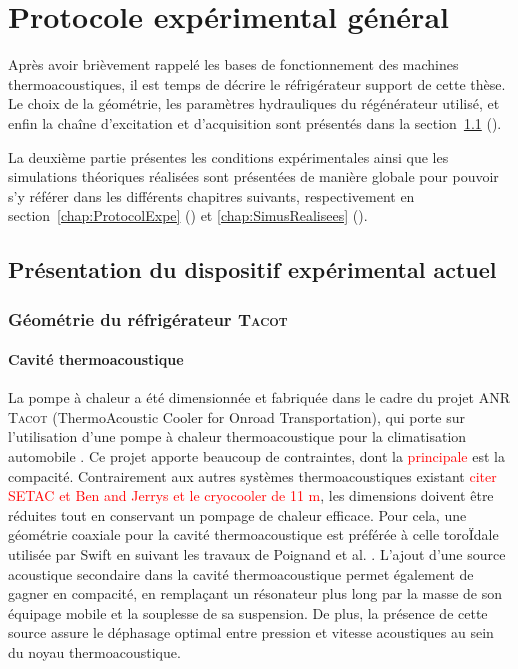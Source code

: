 \chapter{Protocole expérimental général}
\mylocaltoc


Après avoir brièvement rappelé les bases de fonctionnement des machines thermoacoustiques, il est temps de décrire le réfrigérateur support de cette thèse. Le choix de la géométrie, les paramètres hydrauliques du régénérateur utilisé, et enfin la chaîne d'excitation et d'acquisition sont présentés dans la section~\ref{chap:PresentationTacot} ().

La deuxième partie présentes les conditions expérimentales ainsi que les simulations théoriques réalisées sont présentées de manière globale pour pouvoir s'y référer dans les différents chapitres suivants, respectivement en section~\ref{chap:ProtocolExpe} () et \ref{chap:SimusRealisees} ().

\section{Présentation du dispositif expérimental actuel}\label{chap:PresentationTacot}
\subsection{Géométrie du réfrigérateur \textsc{Tacot}}
\subsubsection{Cavité thermoacoustique}
La pompe à chaleur a été dimensionnée et fabriquée dans le cadre du projet ANR \textsc{Tacot} (ThermoAcoustic Cooler for Onroad Transportation), qui porte sur l'utilisation d'une pompe à chaleur thermoacoustique pour la climatisation automobile \cite{ANR_thermo-acoustic_2019}. Ce projet apporte beaucoup de contraintes, dont la \textcolor{red}{principale} est la compacité. Contrairement aux autres systèmes thermoacoustiques existant \textcolor{red}{citer SETAC et Ben and Jerrys et le cryocooler de 11 m}, les dimensions doivent être réduites tout en conservant un pompage de chaleur efficace. Pour cela, une géométrie coaxiale pour la cavité thermoacoustique est préférée à celle toroÏdale utilisée par Swift en suivant les travaux de Poignand et al. \cite{poignand_thermoacoustic_2011,poignand_analysis_2013}. L'ajout d'une source acoustique secondaire dans la cavité thermoacoustique permet également de gagner en compacité, en remplaçant un résonateur plus long par la masse de son équipage mobile et la souplesse de sa suspension. De plus, la présence de cette source assure le déphasage optimal entre pression et vitesse acoustiques au sein du noyau thermoacoustique.%


